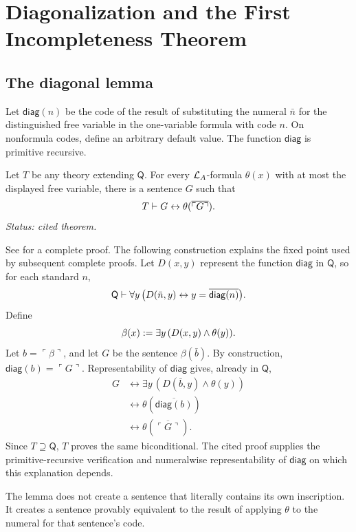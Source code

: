 \chapter{Diagonalization and the First Incompleteness Theorem}
\label{ch:first-incompleteness}

\section{The diagonal lemma}
\label{sec:first-incompleteness-01}

Let \(\mathsf{diag}(n)\) be the code of the result of substituting the numeral
\(\bar n\) for the distinguished free variable in the one-variable formula
with code \(n\).  On nonformula codes, define an arbitrary default value.  The
function \(\mathsf{diag}\) is primitive recursive.

\begin{theorem}
\label{thm:diagonal-lemma}
Let \(T\) be any theory extending \(\mathsf Q\).  For every
\(\mathcal{L}_A\)-formula \(\theta(x)\) with at most the displayed free variable,
there is a sentence \(G\) such that
\[
  T\vdash G\leftrightarrow
  \theta(\overline{\ulcorner G\urcorner}).
\]
\textit{Status: cited theorem.}
\end{theorem}

See \cite{BoolosBurgessJeffrey2007} for a complete proof.  The following
construction explains the fixed point used by subsequent complete proofs.
Let \(D(x,y)\) represent the function \(\mathsf{diag}\) in \(\mathsf Q\), so
for each standard \(n\),
\[
  \mathsf Q\vdash\forall y\,
  \bigl(D(\bar n,y)\leftrightarrow
  y=\overline{\mathsf{diag}(n)}\bigr).
\]
Define
\[
  \beta(x)\mathrel{:=}\exists y\,(D(x,y)\land\theta(y)).
\]
Let \(b=\ulcorner\beta\urcorner\), and let
\(G\) be the sentence \(\beta(\bar b)\).  By construction,
\(\mathsf{diag}(b)=\ulcorner G\urcorner\).  Representability of
\(\mathsf{diag}\) gives, already in \(\mathsf Q\),
\[
\begin{aligned}
  G
  &\leftrightarrow \exists y\,(D(\bar b,y)\land\theta(y))\\
  &\leftrightarrow
  \theta(\overline{\mathsf{diag}(b)})\\
  &\leftrightarrow\theta(\overline{\ulcorner G\urcorner}).
\end{aligned}
\]
Since \(T\supseteq\mathsf Q\), \(T\) proves the same biconditional.
The cited proof supplies the primitive-recursive verification and numeralwise
representability of \(\mathsf{diag}\) on which this explanation depends.

\begin{remark}
The lemma does not create a sentence that literally contains its own
inscription.  It creates a sentence provably equivalent to the result of
applying \(\theta\) to the numeral for that sentence's code.
\end{remark}


